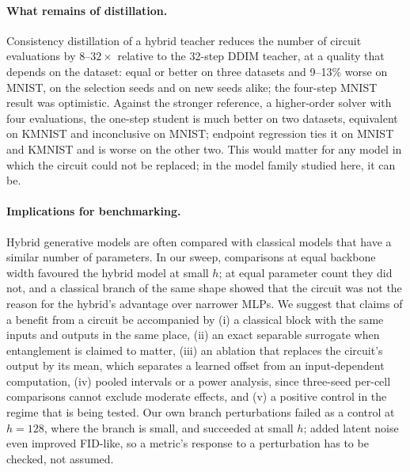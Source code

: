 \documentclass[11pt]{article}
\newcommand{\fidlike}{FID-like}
\begin{document}
\paragraph{What remains of distillation.} Consistency distillation of a hybrid
teacher reduces the number of circuit evaluations by $8$--$32\times$ relative to the
32-step DDIM teacher, at a quality that depends on the dataset: equal or better on
three datasets and 9--13\% worse on MNIST, on the selection seeds and on new seeds
alike; the four-step MNIST result was optimistic. Against the stronger reference,
a higher-order solver with four evaluations, the one-step student is much better on
two datasets, equivalent on KMNIST and inconclusive on MNIST; endpoint regression
ties it on MNIST and KMNIST and is worse on the other two. This would matter for any
model in which the circuit could not be replaced; in the model family studied here,
it can be.

\paragraph{Implications for benchmarking.} Hybrid generative models are often
compared with classical models that have a similar number of parameters. In our
sweep, comparisons at equal backbone width favoured the hybrid model at small
$h$; at equal parameter count they did not, and a classical branch of the same shape
showed that the circuit was not the reason for the hybrid's advantage over
narrower MLPs. We suggest that claims of a benefit from a circuit be accompanied by
(i) a classical block with the same inputs and outputs in the same place, (ii) an
exact separable surrogate when entanglement is claimed to matter, (iii) an ablation
that replaces the circuit's output by its mean, which separates a learned offset
from an input-dependent computation, (iv) pooled intervals or a power analysis,
since three-seed per-cell comparisons cannot exclude moderate effects, and (v) a
positive control in the regime that is being tested. Our own branch perturbations
failed as a control at $h=128$, where the branch is small, and succeeded at small
$h$; added latent noise even improved \fidlike{}, so a metric's response to a
perturbation has to be checked, not assumed.
\end{document}
